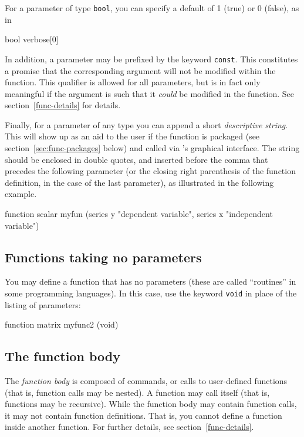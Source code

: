 For a parameter of type \texttt{bool}, you can specify a default of
1 (true) or 0 (false), as in
%    
\begin{code}
bool verbose[0]
\end{code} 

In addition, a parameter may be prefixed by the keyword
\texttt{const}.  This constitutes a promise that the corresponding
argument will not be modified within the function.  This qualifier is
allowed for all parameters, but is in fact only meaningful if the
argument is such that it \textit{could} be modified in the function.
See section~\ref{func-details} for details.

Finally, for a parameter of any type you can append a short
\textsl{descriptive string}.  This will show up as an aid to the user
if the function is packaged (see section~\ref{sec:func-packages}
below) and called via 's graphical interface.  The string
should be enclosed in double quotes, and inserted before the comma
that precedes the following parameter (or the closing right
parenthesis of the function definition, in the case of the last
parameter), as illustrated in the following example.

\begin{code}
function scalar myfun (series y "dependent variable", 
                       series x "independent variable")
\end{code} 

\subsection{Functions taking no parameters}

You may define a function that has no parameters (these are called
``routines'' in some programming languages).  In this case,  
use the keyword \texttt{void} in place of the listing of parameters:
%    
\begin{code}
function matrix myfunc2 (void)
\end{code}


\subsection{The function body}
   
The \textsl{function body} is composed of  commands, or
calls to user-defined functions (that is, function calls may be
nested).  A function may call itself (that is, functions may be
recursive). While the function body may contain function calls, it may
not contain function definitions.  That is, you cannot define a
function inside another function.  For further details, see
section~\ref{func-details}.



